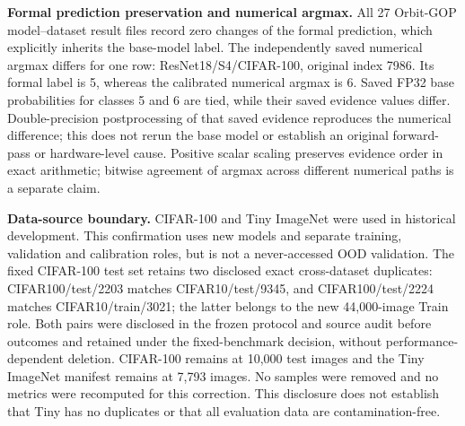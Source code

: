 \textbf{Formal prediction preservation and numerical argmax.} All 27 Orbit-GOP model--dataset result files record zero changes of the formal prediction, which explicitly inherits the base-model label. The independently saved numerical argmax differs for one row: ResNet18/S4/CIFAR-100, original index 7986. Its formal label is 5, whereas the calibrated numerical argmax is 6. Saved FP32 base probabilities for classes 5 and 6 are tied, while their saved evidence values differ. Double-precision postprocessing of that saved evidence reproduces the numerical difference; this does not rerun the base model or establish an original forward-pass or hardware-level cause. Positive scalar scaling preserves evidence order in exact arithmetic; bitwise agreement of argmax across different numerical paths is a separate claim.

\textbf{Data-source boundary.} CIFAR-100 and Tiny ImageNet were used in historical development. This confirmation uses new models and separate training, validation and calibration roles, but is not a never-accessed OOD validation. The fixed CIFAR-100 test set retains two disclosed exact cross-dataset duplicates: CIFAR100/test/2203 matches CIFAR10/test/9345, and CIFAR100/test/2224 matches CIFAR10/train/3021; the latter belongs to the new 44,000-image Train role. Both pairs were disclosed in the frozen protocol and source audit before outcomes and retained under the fixed-benchmark decision, without performance-dependent deletion. CIFAR-100 remains at 10,000 test images and the Tiny ImageNet manifest remains at 7,793 images. No samples were removed and no metrics were recomputed for this correction. This disclosure does not establish that Tiny has no duplicates or that all evaluation data are contamination-free.
